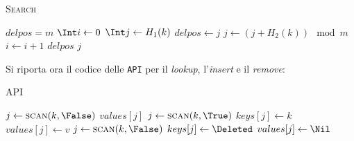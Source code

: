             \begin{algorithm}[H]
                \caption{\textsc{Search}}
                \begin{algorithmic}
                    \State \Int {}
                        \State \Int $delpos = m$
                        \State $\Int i\gets 0$
                        \State $\Int j\gets H_1(k)$
                                \State $delpos\gets j$
                            \EndIf
                            \State $j\gets (j+H_2(k))\mod m$
                            \State $i\gets i+1$
                        \EndWhile
                            \State \Return $delpos$
                        \ElsIf
                            \State \Return $j$
                        \EndIf
                    \EndFunction
                \end{algorithmic}
            \end{algorithm}
            Si riporta ora il codice delle \texttt{API} per il \textit{lookup}, l'\textit{insert} e il \textit{remove}:
            \begin{algorithm}[H]
                \caption{\textsc{API}}
                \begin{algorithmic}
                    \State \Item {}
                        \State $j\gets \Call{scan}{k, \False}$
                            \State \Return $values[j]$
                        \Else
                            \State \Return \Nil
                        \EndIf
                    \EndFunction
                    \State {}
                        \State $j\gets \Call{scan}{k, \True}$
                            \State $keys[j]\gets k$
                            \State $values[j]\gets v$
                        \ElsIf
                            \State {}
                        \EndIf
                    \EndFunction
                    \State {}
                        \State $j\gets \Call{scan}{k, \False}$
                            \State $keys[j]\gets \Deleted$
                            \State $values[j]\gets \Nil$
                        \EndIf
                    \EndFunction
                \end{algorithmic}
            \end{algorithm}

